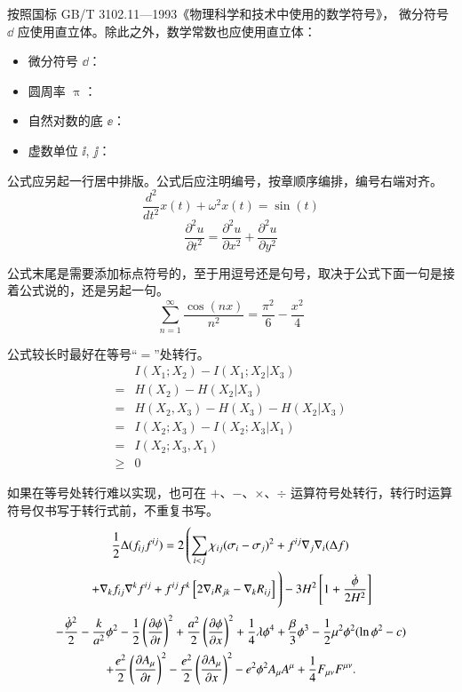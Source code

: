 按照国标 GB/T 3102.11—1993《物理科学和技术中使用的数学符号》，
微分符号 $\dd$ 应使用直立体。除此之外，数学常数也应使用直立体：
\begin{itemize}
  \item 微分符号 $\dd$：
  \item 圆周率 $\uppi$：
  \item 自然对数的底 $\ee$：
  \item 虚数单位 $\ii$, $\jj$： 
\end{itemize}

公式应另起一行居中排版。公式后应注明编号，按章顺序编排，编号右端对齐。
\begin{equation}
  \frac{d^2}{dt^2}x(t)+\omega^2x(t)=\sin(t)
\end{equation}
\begin{equation}
  \frac{\partial^2u}{\partial t^2}=\frac{\partial^2u}{\partial x^2}+\frac{\partial^2u}{\partial y^2}
\end{equation}

公式末尾是需要添加标点符号的，至于用逗号还是句号，取决于公式下面一句是接着公式说的，还是另起一句。
\begin{equation}
		\sum_{n=1}^{\infty}\frac{\cos(nx)}{n^2}=\frac{\pi^2}{6}-\frac{x^2}{4}
\end{equation}

公式较长时最好在等号“$=$”处转行。
\begin{align}
    & I(X_1;X_2)-I(X_1;X_2|X_3) \nonumber \\
  = & H(X_2)-H(X_2|X_3) \nonumber \\
  = & H(X_2,X_3)-H(X_3)-H(X_2|X_3) \nonumber \\
  = & I(X_2;X_3)-I(X_2;X_3|X_1) \nonumber \\
  = & I(X_2;X_3,X_1) \nonumber \\
  \geq & 0
\end{align}

如果在等号处转行难以实现，也可在 $+$、$-$、$\times$、$\div$ 运算符号处转行，转行时运算符号仅书写于转行式前，不重复书写。
\begin{multline}
\frac{1}{2} \Delta (f_{ij} f^{ij}) =
2 \left(\sum_{i<j} \chi_{ij}(\sigma_{i} - \sigma_{j})^{2}
+ f^{ij} \nabla_{j} \nabla_{i} (\Delta f) \right. \\
\left. + \nabla_{k} f_{ij} \nabla^{k} f^{ij} +
f^{ij} f^{k} \left[2\nabla_{i}R_{jk}- \nabla_{k} R_{ij} \right] \vphantom{\sum_{i<j}} \right)
- 3H^{2}\left[1+\frac{\dot{\phi}}{2H^2}\right] \\
- \frac{\dot{\phi}^{2}}{2} - \frac{k}{a^{2}}\phi^{2} - \frac{1}{2}\left(\frac{\partial\phi}{\partial t}\right)^{2} + \frac{a^2}{2}\left(\frac{\partial\phi}{\partial x}\right)^{2}
+ \frac{1}{4}\lambda\phi^{4} + \frac{\beta}{3}\phi^{3} -\frac{1}{2}\mu^{2}\phi^{2}(\ln{\phi^{2}} - c) \\
+ \frac{e^{2}}{2}\left(\frac{\partial A_{\mu}}{\partial t}\right)^{2} - \frac{e^{2}}{2}\left(\frac{\partial A_{\mu}}{\partial x}\right)^{2}
- e^{2}\phi^{2}A_{\mu}A^{\mu} + \frac{1}{4}F_{\mu\nu}F^{\mu\nu}.
\end{multline}


